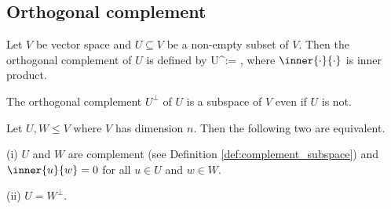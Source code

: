 \subsection{Orthogonal complement}

\begin{definition}\label{def:orthogonal_complement_inner_product}
Let $V$ be vector space and $U\subseteq V$ be a non-empty subset of $V$. Then the orthogonal complement of $U$ is defined by
\be
U^\perp := ,
\ee
where $\inner{\cdot}{\cdot}$ is inner product.

The orthogonal complement $U^\perp$ of $U$ is a subspace of $V$ even if $U$ is not.
\end{definition}

\begin{proposition}\label{pro:orthogonal_complement_iff_complement_plus_all_inner_product_zero}
Let $U,W\leq V$ where $V$ has dimension $n$. Then the following two are equivalent.
\ben
\item [(i)] $U$ and $W$ are complement (see Definition \ref{def:complement_subspace}) and $\inner{u}{w} =0$ for all $u\in U$ and $w\in W$.
\item [(ii)] $U = W^\perp$.
\een
\end{proposition}

